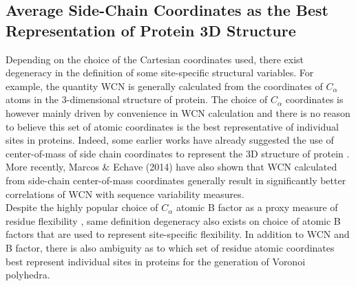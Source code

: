 \documentclass[11pt]{article}
\begin{document}

    \subsection{Average Side-Chain Coordinates as the Best Representation of Protein 3D Structure}
    \label{sec:voronoi_SC}

    Depending on the choice of the Cartesian coordinates used, there exist degeneracy in the definition of some site-specific structural variables. For example, the quantity WCN is generally calculated from the coordinates of $C_\alpha$ atoms in the 3-dimensional structure of protein. The choice of $C_\alpha$ coordinates is however mainly driven by convenience in WCN calculation and there is no reason to believe this set of atomic coordinates is the best representative of individual sites in proteins. Indeed, some earlier works have already suggested the use of center-of-mass of side chain coordinates to represent the 3D structure of protein \cite{soyer_voronoi_2000}. More recently, Marcos \& Echave (2014)\cite{marcos_too_2014} have also shown that WCN calculated from side-chain center-of-mass coordinates generally result in significantly better correlations of WCN with sequence variability measures. \\

    Despite the highly popular choice of $C_\alpha$ atomic B factor as a proxy measure of residue flexibility \cite{halle_flexibility_2002}, same definition degeneracy also exists on choice of atomic B factors that are used to represent site-specific flexibility. In addition to WCN and B factor, there is also ambiguity as to which set of residue atomic coordinates best represent individual sites in proteins for the generation of Voronoi polyhedra. \\
\end{document}
